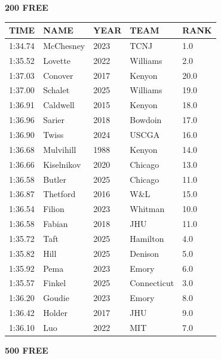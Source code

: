 \begin{table}[H]
\centering
\begin{minipage}[t]{0.48\textwidth}
\centering
\textbf{200 FREE}\\[0.1cm]
\begin{tabular}{@{}p{1.8cm}p{2.8cm}p{1.2cm}p{1.4cm}p{0.8cm}@{}}
\hline
    \textbf{TIME} & \textbf{NAME} & \textbf{YEAR} & \textbf{TEAM} & \textbf{RANK} \\
\hline
    1:34.74 & McChesney & 2023 & TCNJ & 1.0 \\
    1:35.52 & Lovette & 2022 & Williams & 2.0 \\
    1:37.03 & Conover & 2017 & Kenyon & 20.0 \\
    1:37.00 & Schalet & 2025 & Williams & 19.0 \\
    1:36.91 & Caldwell & 2015 & Kenyon & 18.0 \\
    1:36.96 & Sarier & 2018 & Bowdoin & 17.0 \\
    1:36.90 & Twiss & 2024 & USCGA & 16.0 \\
    1:36.68 & Mulvihill & 1988 & Kenyon & 14.0 \\
    1:36.66 & Kiselnikov & 2020 & Chicago & 13.0 \\
    1:36.58 & Butler & 2025 & Chicago & 11.0 \\
    1:36.87 & Thetford & 2016 & W\&L & 15.0 \\
    1:36.54 & Filion & 2023 & Whitman & 10.0 \\
    1:36.58 & Fabian & 2018 & JHU & 11.0 \\
    1:35.72 & Taft & 2025 & Hamilton & 4.0 \\
    1:35.82 & Hill & 2025 & Denison & 5.0 \\
    1:35.92 & Pema & 2023 & Emory & 6.0 \\
    1:35.57 & Finkel & 2025 & Connecticut & 3.0 \\
    1:36.20 & Goudie & 2023 & Emory & 8.0 \\
    1:36.42 & Holder & 2017 & JHU & 9.0 \\
    1:36.10 & Luo & 2022 & MIT & 7.0 \\
\hline
\end{tabular}
\end{minipage}\hfill
\begin{minipage}[t]{0.48\textwidth}
\centering
\textbf{500 FREE}\\[0.1cm]
\begin{tabular}{@{}p{1.8cm}p{2.8cm}p{1.2cm}p{1.4cm}p{0.8cm}@{}}

\end{tabular}
\end{minipage}
\end{table}
